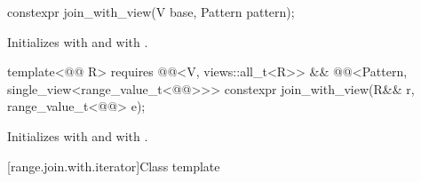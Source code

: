 \begin{itemdecl}
constexpr join_with_view(V base, Pattern pattern);
\end{itemdecl}

\begin{itemdescr}
\pnum
\effects
Initializes  with  and
 with .
\end{itemdescr}

\begin{itemdecl}
template<@@ R>
  requires @@<V, views::all_t<R>> &&
           @@<Pattern, single_view<range_value_t<@@>>>
constexpr join_with_view(R&& r, range_value_t<@@> e);
\end{itemdecl}

\begin{itemdescr}
\pnum
\effects
Initializes  with  and
 with .
\end{itemdescr}

[range.join.with.iterator]{Class template }

